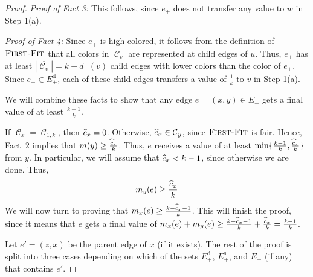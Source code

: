 \documentclass[smallextended]{svjour3}
\newcommand{\colorset}{\ensuremath{\operatorname{\mathcal{C}}}\xspace}
\newcommand{\ed}{\ensuremath{E_{+}^{\text{d}}}\xspace}
\newcommand{\er}{\ensuremath{E_{-}}\xspace}
\newcommand{\es}{\ensuremath{E_{+}^{\text{s}}}\xspace}
\def\dc{d_{+}}
\newcommand{\FF}{\ensuremath{\operatorname{\textsc{First-Fit}}}\xspace}
\newcommand{\ab}[1] {\left\vert #1\right\vert}
\begin{document}
\begin{proof}
{\em Proof of Fact 3:} This follows, since $e_+$ does not transfer any value to $w$ in Step 1(a).

{\em Proof of Fact 4:}
Since $e_+$ is high-colored, it follows from the definition of \FF that
 all colors in $\overline{\colorset_v}$ are represented at child edges of $u$.
Thus, $e_+$ has at least $\ab{\overline{\colorset_v}}=k-\dc(v)$ child
 edges with lower colors than the color of $e_+$.
Since $e_+ \in \ed$, each of these child edges transfers a value of $\frac1k$
 to $v$ in Step 1(a).

We will combine these facts to show that any edge $e=(x,y)\in
 \er$ gets a final value of at least $\frac{k-1}{k}$. 

If $\colorset_x=\colorset_{1,k}$, then $\widehat{c}_x=0$.
Otherwise, $\cmis \in \colorset_y$, since \FF is fair.
Hence, Fact~2 implies that $m(y)\geq\frac{\widehat{c}_x}{k}$. 
Thus, $e$ receives a value of at least $\min \{ \frac{k-1}{k},
 \frac{\widehat{c}_x}{k} \}$ from $y$. 
In particular, we will assume that $\widehat{c}_x<k-1$, since otherwise we are
 done. 
Thus, 
\begin{equation*}
m_y(e) \geq \frac{\widehat{c}_x}{k}
\end{equation*}
We will now turn to proving that $m_x(e) \geq \frac{k-\widehat{c}_x-1}{k}$.
This will finish the proof, since it
 means that $e$ gets a final value of
 $m_x(e) + m_y(e) \geq \frac{k-\widehat{c}_x-1}{k} + \frac{\widehat{c}_x}{k} = \frac{k-1}{k}$.

Let $e'=(z,x)$ be the parent edge of $x$ (if it exists). The rest of the proof is split into three cases depending on which of the sets $\ed$, $\es$, and $\er$ (if any) that contains $e'$.


\end{proof}
\end{document}
